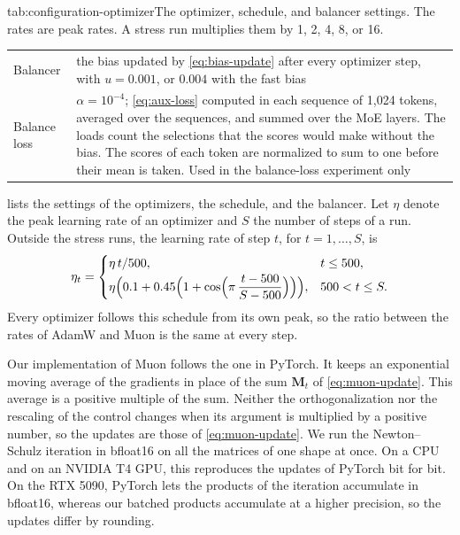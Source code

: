 \begin{table}[The optimizer, schedule, and balancer settings]{tab:configuration-optimizer}{The optimizer, schedule, and balancer settings. The rates are peak rates. A stress run multiplies them by 1, 2, 4, 8, or 16.}
\begin{tabular}{l>{\raggedright\arraybackslash}p{11.6cm}}
    Balancer           & the bias updated by \cref{eq:bias-update} after every optimizer step, with $u = 0.001$, or $0.004$ with the fast bias                                                                         \\
    Balance loss       & $\alpha = 10^{-4}$; \cref{eq:aux-loss} computed in each sequence of 1,024 tokens, averaged over the sequences, and summed over the MoE layers. The loads count the selections that the scores would make without the bias. The scores of each token are normalized to sum to one before their mean is taken. Used in the balance-loss experiment only \\
    \bottomrule
  \end{tabular}
\end{table}

 lists the settings of the optimizers, the schedule, and the balancer. Let $\eta$ denote the peak learning rate of an optimizer and $S$ the number of steps of a run. Outside the stress runs, the learning rate of step $t$, for $t = 1, \dots, S$, is
\begin{equation}[eq:configuration-schedule]{}
  \eta_t =
  \begin{cases}
    \eta \, t / 500,                                                                                   & t \leq 500,     \\[2pt]
    \eta \Bigl( 0.1 + 0.45 \Bigl( 1 + \cos \Bigl( \pi \, \dfrac{t - 500}{S - 500} \Bigr) \Bigr) \Bigr), & 500 < t \leq S.
  \end{cases}
\end{equation}
Every optimizer follows this schedule from its own peak, so the ratio between the rates of AdamW and Muon is the same at every step.

Our implementation of Muon follows the one in PyTorch. It keeps an exponential moving average of the gradients in place of the sum $\mathbf{M}_t$ of \cref{eq:muon-update}. This average is a positive multiple of the sum. Neither the orthogonalization nor the rescaling of the control changes when its argument is multiplied by a positive number, so the updates are those of \cref{eq:muon-update}. We run the Newton--Schulz iteration in bfloat16 on all the matrices of one shape at once. On a CPU and on an NVIDIA T4 GPU, this reproduces the updates of PyTorch bit for bit. On the RTX 5090, PyTorch lets the products of the iteration accumulate in bfloat16, whereas our batched products accumulate at a higher precision, so the updates differ by rounding.

